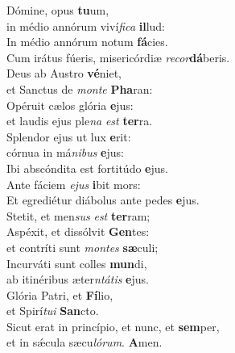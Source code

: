 \evenverse Dómine, opus \textbf{tu}um,~\*\\
\evenverse in médio annórum viví\textit{fi}\textit{ca} \textbf{il}lud:\\
\oddverse In médio annórum notum \textbf{fá}cies.~\*\\
\oddverse Cum irátus fúeris, misericórdiæ \textit{re}\textit{cor}\textbf{dá}beris.\\
\evenverse Deus ab Austro \textbf{vé}niet,~\*\\
\evenverse et Sanctus de \textit{mon}\textit{te} \textbf{Pha}ran:\\
\oddverse Opéruit cælos glória \textbf{e}jus:~\*\\
\oddverse et laudis ejus ple\textit{na} \textit{est} \textbf{ter}ra.\\
\evenverse Splendor ejus ut lux \textbf{e}rit:~\*\\
\evenverse córnua in má\textit{ni}\textit{bus} \textbf{e}jus:\\
\oddverse Ibi abscóndita est fortitúdo \textbf{e}jus.~\*\\
\oddverse Ante fáciem \textit{e}\textit{jus} \textbf{i}bit mors:\\
\evenverse Et egrediétur diábolus ante pedes \textbf{e}jus.~\*\\
\evenverse Stetit, et men\textit{sus} \textit{est} \textbf{ter}ram;\\
\oddverse Aspéxit, et dissólvit \textbf{Gen}tes:~\*\\
\oddverse et contríti sunt \textit{mon}\textit{tes} \textbf{sæ}culi;\\
\evenverse Incurváti sunt colles \textbf{mun}di,~\*\\
\evenverse ab itinéribus æter\textit{ntá}\textit{tis} \textbf{e}jus.\\
\oddverse Glória Patri, et \textbf{Fí}lio,~\*\\
\oddverse et Spirí\textit{tu}\textit{i} \textbf{San}cto.\\
\evenverse Sicut erat in princípio, et nunc, et \textbf{sem}per,~\*\\
\evenverse et in sǽcula sæcu\textit{ló}\textit{rum}. \textbf{A}men.\\
